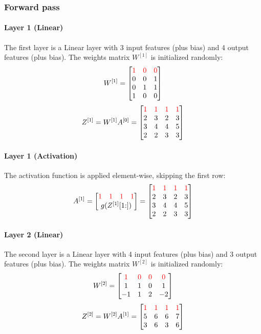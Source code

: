 \subsubsection{Forward pass}
\paragraph{Layer 1 (Linear)} The first layer is a Linear layer with 3 input features (plus bias) and 4 output features (plus bias). The weights matrix $W^{[1]}$ is initialized randomly:
\begin{equation*}
    W^{[1]} = \mqty[
        \color{red} 1 & \color{red} 0 & \color{red} 0 \\
        0 & 0 & 1 \\
        0 & 1 & 1 \\
        1 & 0 & 0
    ]
\end{equation*}
\begin{equation*}
    Z^{[1]} = W^{[1]} A^{[0]} = \mqty[
        \color{red} 1 & \color{red} 1 & \color{red} 1 & \color{red} 1 \\
        2 & 3 & 2 & 3 \\
        3 & 4 & 4 & 5 \\
        2 & 2 & 3 & 3
    ]
\end{equation*}

\paragraph{Layer 1 (Activation)} The activation function is applied element-wise, skipping the first row:
\begin{equation*}
    A^{[1]} = \mqty[
        \mqty{\color{red} 1 & \color{red} 1 & \color{red} 1 & \color{red} 1} \\
        g(Z^{[1]}[1\hspace{-0.6ex}:])
    ] = \mqty[
        \color{red} 1 & \color{red} 1 & \color{red} 1 & \color{red} 1 \\
        2 & 3 & 2 & 3 \\
        3 & 4 & 4 & 5 \\
        2 & 2 & 3 & 3
    ]
\end{equation*}

\paragraph{Layer 2 (Linear)} The second layer is a Linear layer with 4 input features (plus bias) and 3 output features (plus bias). The weights matrix $W^{[2]}$ is initialized randomly:
\begin{equation*}
    W^{[2]} = \mqty[
        \color{red} 1 & \color{red} 0 & \color{red} 0 & \color{red} 0\\
        1 & 1 & 0 & 1\\
        -1 & 1 & 2 & -2
    ]
\end{equation*}
\begin{equation*}
    Z^{[2]} = W^{[2]} A^{[1]} = \mqty[
        \color{red} 1 & \color{red} 1 & \color{red} 1 & \color{red} 1 \\
        5 & 6 & 6 & 7 \\
        3 & 6 & 3 & 6
    ]
\end{equation*}

